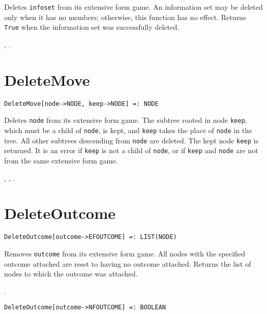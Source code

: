 \noindent
Deletes \verb+infoset+ from its extensive form game.  An information set
may be deleted only when it has no members; otherwise, this function has
no effect.  Returns \verb+True+ when the information set was successfully
deleted.

\seealso {},
.


\section*{DeleteMove}\label{PrimDeleteMove}
\begin{verbatim}
DeleteMove[node->NODE, keep->NODE] =: NODE 
\end{verbatim}

\noindent
Deletes \verb+node+ from its extensive form game.  The
subtree rooted in node \verb+keep+, which must be a child of
\verb+node+, is kept, and \verb+keep+ takes the place of \verb+node+ in
the tree.  All other subtrees descending from \verb+node+ are deleted.
The kept node \verb+keep+ is returned.  It is an error if \verb+keep+
is not a child of \verb+node+, or if \verb+keep+ and \verb+node+ are not
from the same extensive form game.

\seealso {}, 
,
.


\section*{DeleteOutcome}\label{PrimDeleteOutcome}
\begin{verbatim}
DeleteOutcome[outcome->EFOUTCOME] =: LIST(NODE) 
\end{verbatim}

\noindent
Removes \verb+outcome+ from its extensive form game.  All nodes with
the specified outcome attached are reset to having no outcome
attached.  Returns the list of nodes to which the outcome was
attached.

\seealso {}.

\begin{verbatim}
DeleteOutcome[outcome->NFOUTCOME] =: BOOLEAN 
\end{verbatim}

